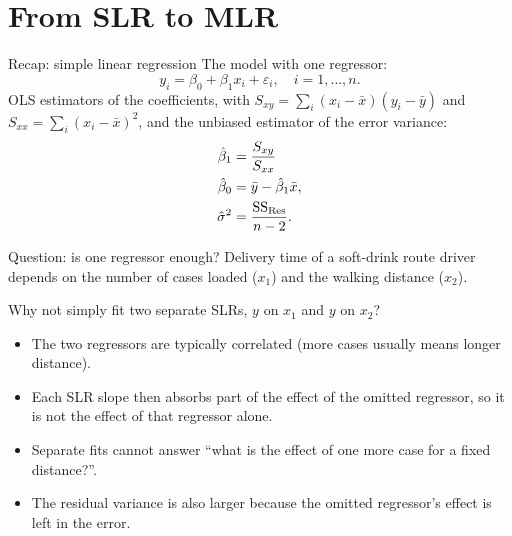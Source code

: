 \section{From SLR to MLR}


\begin{frame}{Recap: simple linear regression}
    The model with one regressor:
    \[
    y_i = \beta_0 + \beta_1 x_i + \varepsilon_i, \quad i=1,\dots,n.
    \]
    OLS estimators of the coefficients, with $S_{xy}=\sum_i(x_i-\bar x)(y_i-\bar y)$ and $S_{xx}=\sum_i(x_i-\bar x)^2$, and the unbiased estimator of the error variance:
    \begin{align}
        \hat\beta_1 &= \frac{S_{xy}}{S_{xx}} \label{eq:slr-b1}\\
        \hat\beta_0 &= \bar y - \hat\beta_1 \bar x, \notag\\
        \hat\sigma^2 &= \frac{\mathrm{SS}_{\mathrm{Res}}}{n-2}. \label{eq:slr-s2}
    \end{align}
\end{frame}


\begin{frame}{Question: is one regressor enough?}
    Delivery time of a soft-drink route driver depends on the number of cases loaded ($x_1$) and the walking distance ($x_2$).

    Why not simply fit two separate SLRs, $y$ on $x_1$ and $y$ on $x_2$?

    \begin{itemize}
        \item The two regressors are typically correlated (more cases usually means longer distance).
        \item Each SLR slope then absorbs part of the effect of the omitted regressor, so it is not the effect of that regressor alone.
        \item Separate fits cannot answer ``what is the effect of one more case for a fixed distance?''.
        \item The residual variance is also larger because the omitted regressor's effect is left in the error.
    \end{itemize}
\end{frame}


